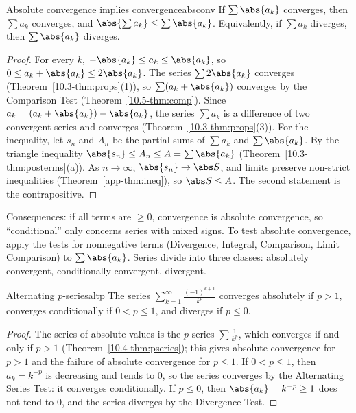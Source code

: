 \documentclass[11pt]{article}
\begin{document}
\begin{thm}{Absolute convergence implies convergence}{absconv}
If $\sum\abs{a_k}$ converges, then $\sum a_k$ converges, and $\abs{\sum a_k}\le\sum\abs{a_k}$. Equivalently, if $\sum a_k$ diverges, then $\sum\abs{a_k}$ diverges.
\end{thm}
\begin{proof}
For every $k$, $-\abs{a_k}\le a_k\le\abs{a_k}$, so $0\le a_k+\abs{a_k}\le2\abs{a_k}$. The series $\sum2\abs{a_k}$ converges (Theorem~\ref{10.3-thm:props}(1)), so $\sum(a_k+\abs{a_k})$ converges by the Comparison Test (Theorem~\ref{10.5-thm:comp}). Since $a_k=(a_k+\abs{a_k})-\abs{a_k}$, the series $\sum a_k$ is a difference of two convergent series and converges (Theorem~\ref{10.3-thm:props}(3)). For the inequality, let $s_n$ and $A_n$ be the partial sums of $\sum a_k$ and $\sum\abs{a_k}$. By the triangle inequality $\abs{s_n}\le A_n\le A=\sum\abs{a_k}$ (Theorem~\ref{10.3-thm:posterms}(a)). As $n\to\infty$, $\abs{s_n}\to\abs S$, and limits preserve non-strict inequalities (Theorem~\ref{app-thm:ineq}), so $\abs S\le A$. The second statement is the contrapositive.
\end{proof}

Consequences: if all terms are $\ge0$, convergence is absolute convergence, so ``conditional'' only concerns series with mixed signs. To test absolute convergence, apply the tests for nonnegative terms (Divergence, Integral, Comparison, Limit Comparison) to $\sum\abs{a_k}$. Series divide into three classes: absolutely convergent, conditionally convergent, divergent.

\begin{thm}{Alternating $p$-series}{altp}
The series $\displaystyle\sum_{k=1}^\infty\frac{(-1)^{k+1}}{k^p}$ converges absolutely if $p>1$, converges conditionally if $0<p\le1$, and diverges if $p\le0$.
\end{thm}
\begin{proof}
The series of absolute values is the $p$-series $\sum\frac1{k^p}$, which converges if and only if $p>1$ (Theorem~\ref{10.4-thm:pseries}); this gives absolute convergence for $p>1$ and the failure of absolute convergence for $p\le1$. If $0<p\le1$, then $a_k=k^{-p}$ is decreasing and tends to $0$, so the series converges by the Alternating Series Test: it converges conditionally. If $p\le0$, then $\abs{a_k}=k^{-p}\ge1$ does not tend to $0$, and the series diverges by the Divergence Test.
\end{proof}
\end{document}
